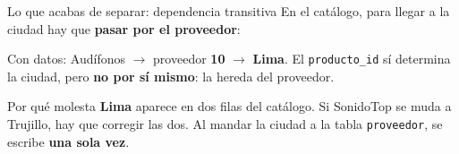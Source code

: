 \documentclass[aspectratio=169,10pt,c]{beamer}
\begin{document}
\begin{frame}{Lo que acabas de separar: dependencia transitiva}
\small En el catálogo, para llegar a la ciudad hay que \textbf{pasar por el proveedor}:
\vspace{0.3cm}
\begin{center}
\end{center}
\vspace{0.25cm}
\small Con datos: Audífonos $\rightarrow$ proveedor \textbf{10} $\rightarrow$ \textbf{Lima}. El \texttt{producto\_id} sí determina la ciudad, pero \textbf{no por sí mismo}: la hereda del proveedor.
\vspace{0.3cm}
\begin{alertblock}{Por qué molesta}
\small \textbf{Lima} aparece en dos filas del catálogo. Si SonidoTop se muda a Trujillo, hay que corregir las dos. Al mandar la ciudad a la tabla \texttt{proveedor}, se escribe \textbf{una sola vez}.
\end{alertblock}
\end{frame}
\end{document}
